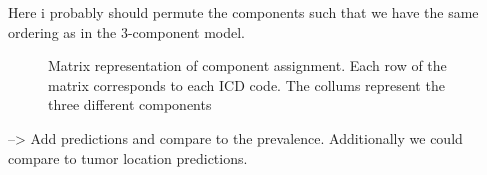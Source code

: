 \documentclass[
  sn-mathphys-num,
]{sn-jnl}
\begin{document}
Here i probably should permute the components such that we have the same
ordering as in the 3-component model.

\begin{figure}


\caption{\label{fig-4-matrix}Matrix representation of component
assignment. Each row of the matrix corresponds to each ICD code. The
collums represent the three different components}

\end{figure}%

--\textgreater{} Add predictions and compare to the prevalence.
Additionally we could compare to tumor location predictions.


  
\end{document}
